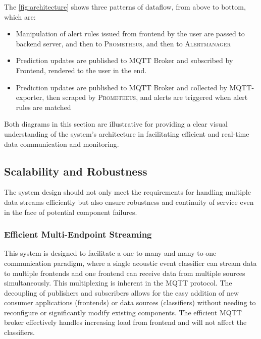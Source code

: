 The \ref{fig:architecture} shows three patterns of dataflow, from above to bottom, which are:
\begin{itemize}
  \item Manipulation of alert rules issued from frontend by the user are passed to backend server, and then to \textsc{Prometheus}, and then to \textsc{Alertmanager}
  \item Prediction updates are published to MQTT Broker and subscribed by Frontend, rendered to the user in the end.
  \item Prediction updates are published to MQTT Broker and collected by MQTT-exporter, then scraped by \textsc{Prometheus}, and alerts are triggered when alert rules are matched
\end{itemize}

Both diagrams in this section are illustrative for providing a clear visual understanding of the system's architecture in facilitating efficient and real-time data communication and monitoring.

\subsection{Scalability and Robustness}
The system design should not only meet the requirements for handling multiple data streams efficiently but also ensure robustness and continuity of service even in the face of potential component failures.

\subsubsection{Efficient Multi-Endpoint Streaming}
This system is designed to facilitate a one-to-many and many-to-one communication paradigm, where a single acoustic event classifier can stream data to multiple frontends and one frontend can receive data from multiple sources simultaneously. This multiplexing is inherent in the MQTT protocol. The decoupling of publishers and subscribers allows for the easy addition of new consumer applications (frontends) or data sources (classifiers) without needing to reconfigure or significantly modify existing components. The efficient MQTT broker effectively handles increasing load from frontend and will not affect the classifiers.

